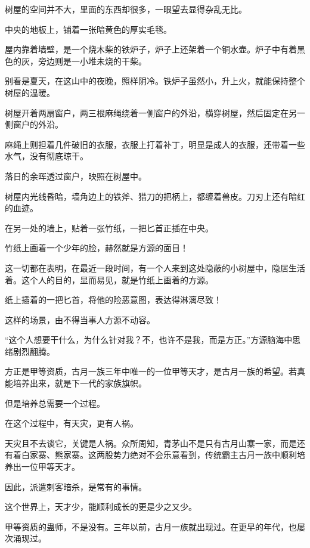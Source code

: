 
\begin{this_body}



树屋的空间并不大，里面的东西却很多，一眼望去显得杂乱无比。

中央的地板上，铺着一张暗黄色的厚实毛毯。

屋内靠着墙壁，是一个烧木柴的铁炉子，炉子上还架着一个铜水壶。炉子中有着黑色的灰，旁边则是一小堆未烧的干柴。

别看是夏天，在这山中的夜晚，照样阴冷。铁炉子虽然小，升上火，就能保持整个树屋的温暖。

树屋开着两扇窗户，两三根麻绳绕着一侧窗户的外沿，横穿树屋，然后固定在另一侧窗户的外沿。

麻绳上则担着几件破旧的衣服，衣服上打着补丁，明显是成人的衣服，还带着一些水气，没有彻底晾干。

落日的余晖透过窗户，映照在树屋中。

树屋内光线昏暗，墙角边上的铁斧、猎刀的把柄上，都缠着兽皮。刀刃上还有暗红的血迹。

在另一处的墙上，贴着一张竹纸，一把匕首正插在中央。

竹纸上画着一个少年的脸，赫然就是方源的面目！

这一切都在表明，在最近一段时间，有一个人来到这处隐蔽的小树屋中，隐居生活着。这个人的目的，显而易见，就是竹纸上画着的方源。

纸上插着的一把匕首，将他的险恶意图，表达得淋漓尽致！

这样的场景，由不得当事人方源不动容。

“这个人想要干什么，为什么针对我？不，也许不是我，而是方正。”方源脑海中思绪剧烈翻腾。

方正是甲等资质，古月一族三年中唯一的一位甲等天才，是古月一族的希望。若真能培养出来，就是下一代的家族旗帜。

但是培养总需要一个过程。

在这个过程中，有天灾，更有人祸。

天灾且不去谈它，关键是人祸。众所周知，青茅山不是只有古月山寨一家，而是还有着白家寨、熊家寨。这两股势力绝对不会乐意看到，传统霸主古月一族中顺利培养出一位甲等天才。

因此，派遣刺客暗杀，是常有的事情。

这个世界上，天才少，能顺利成长的更是少之又少。

甲等资质的蛊师，不是没有。三年以前，古月一族就出现过。在更早的年代，也屡次涌现过。


\end{this_body}
